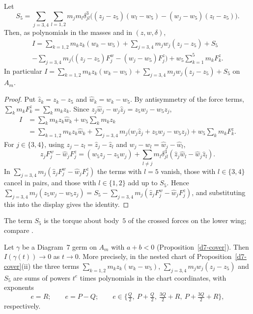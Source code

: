 \begin{lemma}\label{d7-identity}
Let
\[
  S_5=\sum_{j=3,4}\sum_{l=1,2}m_jm_l\delta_{jl}^3
  \bigl((z_j-z_5)(w_l-w_5)-(w_j-w_5)(z_l-z_5)\bigr).
\]
Then, as polynomials in the masses and in $(z,w,\delta)$,
\begin{multline*}
  I=\sum_{k=1,2}m_kz_k(w_k-w_5)+\sum_{j=3,4}m_jw_j(z_j-z_5)+S_5\\
  -\sum_{j=3,4}m_j\bigl((z_j-z_5)F^w_j-(w_j-w_5)F^z_j\bigr)+w_5\sum_{k=1}^5m_kF^z_k.
\end{multline*}
In particular $I=\sum_{k=1,2}m_kz_k(w_k-w_5)+\sum_{j=3,4}m_jw_j(z_j-z_5)+S_5$ on $A_m$.
\end{lemma}

\begin{proof}
Put $\hat z_k=z_k-z_5$ and $\hat w_k=w_k-w_5$.  By antisymmetry of the force terms,
$\sum_km_kF^z_k=\sum_km_kz_k$.  Since $z_j\hat w_j-w_j\hat z_j=z_5w_j-w_5z_j$,
\begin{align*}
  I&=\sum_km_kz_k\hat w_k+w_5\sum_km_kz_k\\
   &=\sum_{k=1,2}m_kz_k\hat w_k+\sum_{j=3,4}m_j\bigl(w_j\hat z_j+z_5w_j-w_5z_j\bigr)
    +w_5\sum_km_kF^z_k.
\end{align*}
For $j\in\{3,4\}$, using $z_j-z_l=\hat z_j-\hat z_l$ and $w_j-w_l=\hat w_j-\hat w_l$,
\[
  \hat z_jF^w_j-\hat w_jF^z_j=(w_5z_j-z_5w_j)
  +\sum_{l\ne j}m_l\delta_{jl}^3(\hat z_j\hat w_l-\hat w_j\hat z_l).
\]
In $\sum_{j=3,4}m_j(\hat z_jF^w_j-\hat w_jF^z_j)$ the terms with $l=5$ vanish, those with
$l\in\{3,4\}$ cancel in pairs, and those with $l\in\{1,2\}$ add up to $S_5$.  Hence
$\sum_{j=3,4}m_j(z_5w_j-w_5z_j)=S_5-\sum_{j=3,4}m_j(\hat z_jF^w_j-\hat w_jF^z_j)$, and
substituting this into the display gives the identity.
\end{proof}

The term $S_5$ is the torque about body~$5$ of the crossed forces on the lower wing; compare
\cite[(31)]{AK}.

\begin{lemma}\label{d7-vanish}
Let $\gamma$ be a Diagram~7 germ on $A_m$ with $a+b<0$ (Proposition~\ref{d7-cover}).  Then
$I(\gamma(t))\to0$ as $t\to0$.
More precisely, in the nested chart of Proposition~\ref{d7-cover}(ii) the three terms
$\sum_{k=1,2}m_kz_k(w_k-w_5)$, $\sum_{j=3,4}m_jw_j(z_j-z_5)$ and $S_5$ are sums of powers $t^e$
times polynomials in the chart coordinates, with exponents
\[
  e=R;\qquad e=P-Q;\qquad e\in\bigl\{\tfrac Q2,\ P+\tfrac Q2,\ \tfrac{3Q}2+R,\ P+\tfrac{3Q}2+R\bigr\},
\]
respectively.
\end{lemma}

